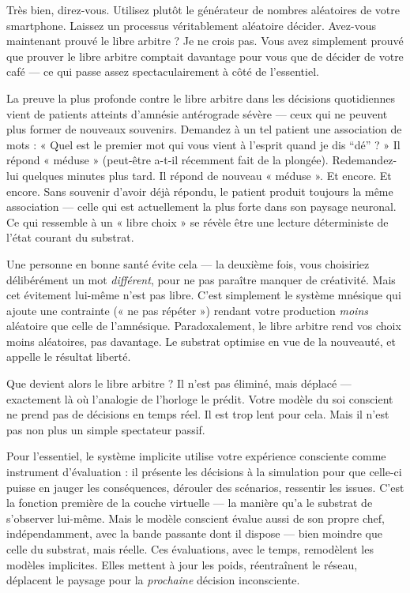 \documentclass[11pt, twoside, openright]{book}
\begin{document}
Très bien, direz-vous. Utilisez plutôt le générateur de nombres aléatoires de votre smartphone. Laissez un processus véritablement aléatoire décider. Avez-vous maintenant prouvé le libre arbitre ? Je ne crois pas. Vous avez simplement prouvé que prouver le libre arbitre comptait davantage pour vous que de décider de votre café --- ce qui passe assez spectaculairement à côté de l'essentiel.

La preuve la plus profonde contre le libre arbitre dans les décisions quotidiennes vient de patients atteints d'amnésie antérograde sévère --- ceux qui ne peuvent plus former de nouveaux souvenirs. Demandez à un tel patient une association de mots : « Quel est le premier mot qui vous vient à l'esprit quand je dis ``dé'' ? » Il répond « méduse » (peut-être a-t-il récemment fait de la plongée). Redemandez-lui quelques minutes plus tard. Il répond de nouveau « méduse ». Et encore. Et encore. Sans souvenir d'avoir déjà répondu, le patient produit toujours la même association --- celle qui est actuellement la plus forte dans son paysage neuronal. Ce qui ressemble à un « libre choix » se révèle être une lecture déterministe de l'état courant du substrat.

Une personne en bonne santé évite cela --- la deuxième fois, vous choisiriez délibérément un mot \textit{différent}, pour ne pas paraître manquer de créativité. Mais cet évitement lui-même n'est pas libre. C'est simplement le système mnésique qui ajoute une contrainte (« ne pas répéter ») rendant votre production \textit{moins} aléatoire que celle de l'amnésique. Paradoxalement, le libre arbitre rend vos choix moins aléatoires, pas davantage. Le substrat optimise en vue de la nouveauté, et appelle le résultat liberté.

Que devient alors le libre arbitre ? Il n'est pas éliminé, mais déplacé --- exactement là où l'analogie de l'horloge le prédit. Votre modèle du soi conscient ne prend pas de décisions en temps réel. Il est trop lent pour cela. Mais il n'est pas non plus un simple spectateur passif.

Pour l'essentiel, le système implicite utilise votre expérience consciente comme instrument d'évaluation : il présente les décisions à la simulation pour que celle-ci puisse en jauger les conséquences, dérouler des scénarios, ressentir les issues. C'est la fonction première de la couche virtuelle --- la manière qu'a le substrat de s'observer lui-même. Mais le modèle conscient évalue aussi de son propre chef, indépendamment, avec la bande passante dont il dispose --- bien moindre que celle du substrat, mais réelle. Ces évaluations, avec le temps, remodèlent les modèles implicites. Elles mettent à jour les poids, réentraînent le réseau, déplacent le paysage pour la \textit{prochaine} décision inconsciente.
\end{document}
